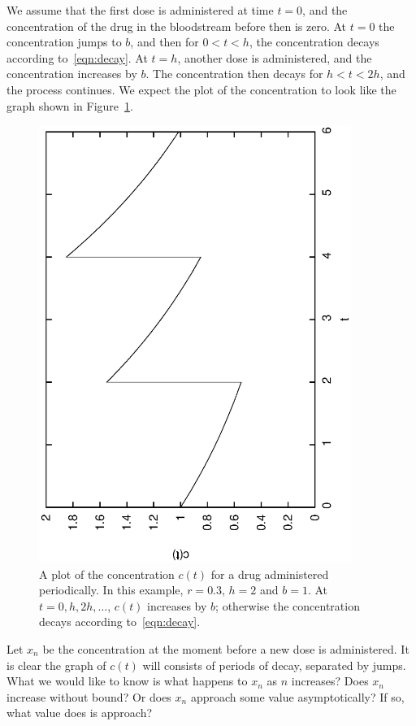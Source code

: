 \documentclass[reqno]{immbook}
\numberwithin{equation}{chapter}
\numberwithin{question}{section}
\numberwithin{theorem}{chapter}
\numberwithin{figure}{chapter}
\theoremstyle{definition}
\begin{document}
We assume that the first dose is administered at time $t=0$, and
the concentration of the drug in the bloodstream before then
is zero.  At $t=0$ the concentration jumps to $b$, and then
for $0 < t < h$, the concentration decays according
to~\eqref{eqn:decay}.  At $t=h$, another dose is administered,
and the concentration increases by $b$. The concentration then decays
for $h < t < 2h$, and the process continues.
We expect the plot of the concentration to look like
the graph shown in Figure~\ref{fig:PeriodicDrugDosePlot}.
\begin{figure}
\centerline{%
\includegraphics[angle=270,width=4in]{python_PeriodicDrugDose/PeriodicDrugDosePlot.eps}
}
\caption{A plot of the concentration $c(t)$ for a drug administered
periodically.  In this example, $r=0.3$, $h=2$ and $b=1$.
At $t=0, h, 2h, \ldots$, $c(t)$ increases by $b$; otherwise
the concentration decays according to~\eqref{eqn:decay}.}
\label{fig:PeriodicDrugDosePlot}
\end{figure}


Let $x_n$ be the concentration at the moment before
a new dose is administered.
It is clear the graph of $c(t)$ will consists of
periods of decay, separated by jumps.  What we would like to
know is what happens to $x_n$ as $n$ increases?
Does $x_n$ increase without bound? Or does $x_n$ approach
some value asymptotically?  If so, what value does is approach?
\end{document}
